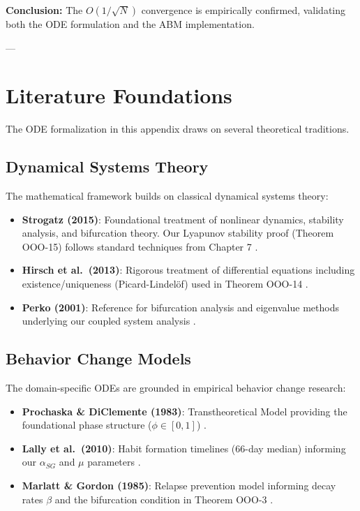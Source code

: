 \textbf{Conclusion:} The $O(1/\sqrt{N})$ convergence is empirically confirmed,
validating both the ODE formulation and the ABM implementation.

---


\section{Literature Foundations}
\label{ooo:literature}

The ODE formalization in this appendix draws on several theoretical traditions.

\subsection{Dynamical Systems Theory}

The mathematical framework builds on classical dynamical systems theory:

\begin{itemize}
\item \textbf{Strogatz (2015)}: Foundational treatment of nonlinear dynamics, stability analysis,
      and bifurcation theory. Our Lyapunov stability proof (Theorem OOO-15) follows standard
      techniques from Chapter 7 \citep{strogatz2015nonlinear}.

\item \textbf{Hirsch et al.~(2013)}: Rigorous treatment of differential equations including
      existence/uniqueness (Picard-Lindelöf) used in Theorem OOO-14 \citep{hirsch2013differential}.

\item \textbf{Perko (2001)}: Reference for bifurcation analysis and eigenvalue methods
      underlying our coupled system analysis \citep{perko2001differential}.
\end{itemize}

\subsection{Behavior Change Models}

The domain-specific ODEs are grounded in empirical behavior change research:

\begin{itemize}
\item \textbf{Prochaska \& DiClemente (1983)}: Transtheoretical Model providing the
      foundational phase structure ($\phi \in [0,1]$) \citep{prochaska1983stages}.

\item \textbf{Lally et al.~(2010)}: Habit formation timelines (66-day median) informing
      our $\alpha_{SG}$ and $\mu$ parameters \citep{lally2010habits}.

\item \textbf{Marlatt \& Gordon (1985)}: Relapse prevention model informing decay rates
      $\beta$ and the bifurcation condition in Theorem OOO-3 \citep{marlatt1985relapse}.
\end{itemize}

